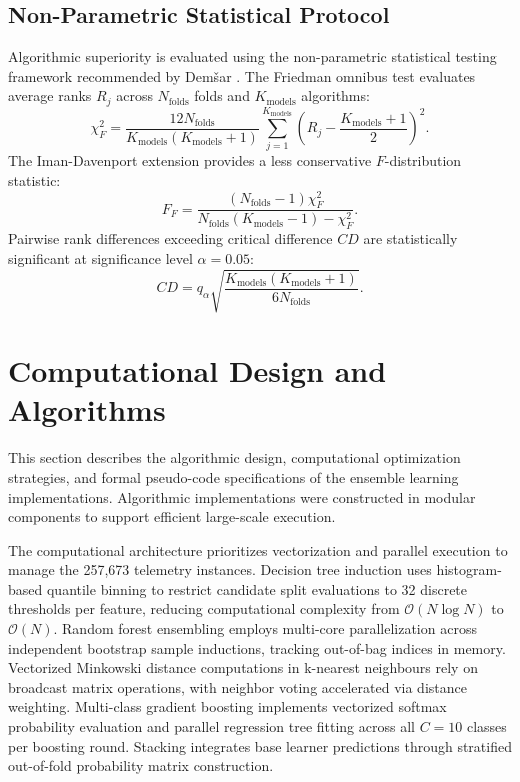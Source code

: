 \documentclass[10pt,conference,compsoc]{IEEEtran}
\begin{document}
\subsection{Non-Parametric Statistical Protocol}
Algorithmic superiority is evaluated using the non-parametric statistical testing framework recommended by Dem\v{s}ar \cite{demsar2006}. The Friedman omnibus test evaluates average ranks $R_j$ across $N_{\text{folds}}$ folds and $K_{\text{models}}$ algorithms:
\begin{equation}
\chi_F^2 = \frac{12 N_{\text{folds}}}{K_{\text{models}}(K_{\text{models}}+1)} \sum_{j=1}^{K_{\text{models}}} \left( R_j - \frac{K_{\text{models}}+1}{2} \right)^2.
\end{equation}
The Iman-Davenport extension provides a less conservative $F$-distribution statistic:
\begin{equation}
F_F = \frac{(N_{\text{folds}} - 1) \chi_F^2}{N_{\text{folds}}(K_{\text{models}} - 1) - \chi_F^2}.
\end{equation}
Pairwise rank differences exceeding critical difference $CD$ are statistically significant at significance level $\alpha = 0.05$:
\begin{equation}
CD = q_{\alpha} \sqrt{\frac{K_{\text{models}}(K_{\text{models}}+1)}{6 N_{\text{folds}}}}.
\end{equation}

\section{Computational Design and Algorithms}

This section describes the algorithmic design, computational optimization strategies, and formal pseudo-code specifications of the ensemble learning implementations. Algorithmic implementations were constructed in modular components to support efficient large-scale execution.

The computational architecture prioritizes vectorization and parallel execution to manage the 257,673 telemetry instances. Decision tree induction uses histogram-based quantile binning to restrict candidate split evaluations to 32 discrete thresholds per feature, reducing computational complexity from $\mathcal{O}(N \log N)$ to $\mathcal{O}(N)$. Random forest ensembling employs multi-core parallelization across independent bootstrap sample inductions, tracking out-of-bag indices in memory. Vectorized Minkowski distance computations in k-nearest neighbours rely on broadcast matrix operations, with neighbor voting accelerated via distance weighting. Multi-class gradient boosting implements vectorized softmax probability evaluation and parallel regression tree fitting across all $C=10$ classes per boosting round. Stacking integrates base learner predictions through stratified out-of-fold probability matrix construction.
\end{document}
